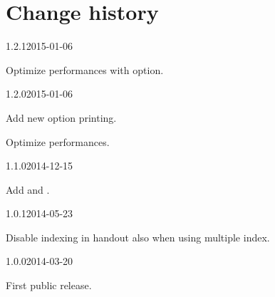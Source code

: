 \documentclass{ltxdockit}[2011/03/25]
\begin{document}
\section{Change history}

\begin{changelog}

\begin{release}{1.2.1}{2015-01-06}
\item Optimize performances with  option. 
\end{release}

\begin{release}{1.2.0}{2015-01-06}
\item Add new option printing. 
\item Optimize performances. 
\end{release}

\begin{release}{1.1.0}{2014-12-15}
\item Add  and . 
\end{release}

\begin{release}{1.0.1}{2014-05-23}
\item Disable indexing in handout also when using multiple index.
\end{release}

\begin{release}{1.0.0}{2014-03-20}
\item First public release.
\end{release}
\end{changelog}
\end{document}
